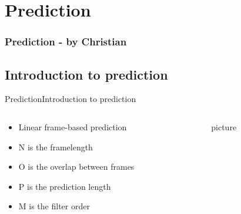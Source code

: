 \section{Prediction}
\begin{frame}
	\frametitle{Prediction - by Christian}
	\tableofcontents[currentsection]
\end{frame}

\subsection{Introduction to prediction}
\begin{frame}{Prediction}{Introduction to prediction}
	\begin{columns}
		\begin{column}{0.5\textwidth}
			\begin{itemize}
				\item Linear frame-based prediction
				\item N is the framelength
				\item O is the overlap between frames
				\item P is the prediction length
				\item M is the filter order
			\end{itemize}
		\end{column}
		\begin{column}{0.5\textwidth} 
			picture	
		\end{column}
	\end{columns}
\end{frame}

